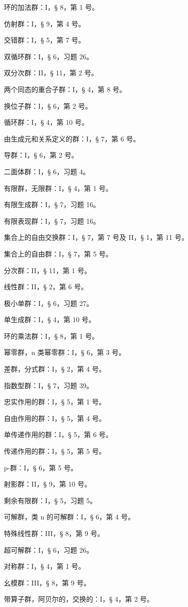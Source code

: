 环的加法群：I，§ 8，第 1 号。

仿射群：I，§ 9，第 4 号。

交错群：I，§ 5，第 7 号。

双循环群：I，§ 6，习题 26。

双分次群：II，§ 11，第 2 号。

两个同态的重合子群：I，§ 4，第 8 号。

换位子群：I，§ 6，第 2 号。

循环群：I，§ 4，第 10 号。

由生成元和关系定义的群：I，§ 7，第 6 号。

导群：I，§ 6，第 2 号。

二面体群：I，§ 6，习题 4。

有限群，无限群：I，§ 4，第 1 号。

有限生成群：I，§ 7，习题 16。

有限表现群：I，§ 7，习题 16。

集合上的自由交换群：I，§ 7，第 7 号及 II，§ 1，第 11 号。

集合上的自由群：I，§ 7，第 5 号。

分次群：II，§ 11，第 1 号。

线性群：II，§ 2，第 6 号。

极小单群：I，§ 6，习题 27。

单生成群：I，§ 4，第 10 号。

环的乘法群：I，§ 8，第 1 号。

幂零群，n 类幂零群：I，§ 6，第 3 号。

差群，分式群：I，§ 2，第 4 号。

指数型群：I，§ 7，习题 39。

忠实作用的群：I，§ 5，第 1 号。

自由作用的群：I，§ 5，第 4 号。

单传递作用的群：I，§ 5，第 6 号。

传递作用的群：I，§ 5，第 5 号。

p-群：I，§ 6，第 5 号。

射影群：II，§ 9，第 10 号。

剩余有限群：I，§ 5，习题 5。

可解群，类 n 的可解群：I，§ 6，第 4 号。

特殊线性群：III，§ 8，第 9 号。

超可解群：I，§ 6，习题 26。

对称群：I，§ 4，第 1 号。

幺模群：III，§ 8，第 9 号。

带算子群，阿贝尔的，交换的：I，§ 4，第 2 号。

